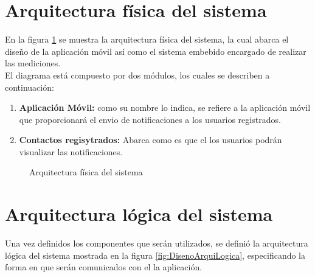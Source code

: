 \newpage
\section{Arquitectura física del sistema}
En la figura \ref{fig:DisenoArquiFisica} se muestra la arquitectura física del sistema, la cual abarca el diseño de la aplicación móvil así como el sistema embebido encargado de realizar las mediciones.\\

El diagrama está compuesto por dos módulos, los cuales se describen a continuación:
\begin{enumerate}
	\item \textbf{Aplicación Móvil:} como su nombre lo indica, se refiere a la aplicación móvil que proporcionará el envio de notificaciones a los usuarios registrados.
	\item \textbf{Contactos regisytrados:} Abarca como es que el los usuarios podrán visualizar las notificaciones.
\end{enumerate}

\begin{figure}[htbp!]
	\centering
	\caption{Arquitectura física del sistema}
	\label{fig:DisenoArquiFisica}
\end{figure}
\clearpage

\section{Arquitectura lógica del sistema}
Una vez definidos los componentes que serán utilizados, se definió la arquitectura lógica del sistema mostrada en la figura \ref{fig:DisenoArquiLogica}, especificando la forma en que serán comunicados con el la aplicación.\\


